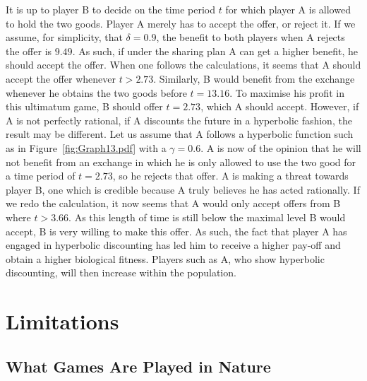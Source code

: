\documentclass[a4paper,10pt]{article}
\numberwithin{equation}{section}
\begin{document}
It is up to player B to decide on the time period $t$ for which player A is allowed to hold the two goods. Player A merely has to accept the offer, or reject it. If we assume, for simplicity, that $\delta=0.9$, the benefit to both players when A rejects the offer is $9.49$. As such, if under the sharing plan A can get a higher benefit, he should accept the offer. When one follows the calculations, it seems that A should accept the offer whenever $t>2.73$. Similarly, B would benefit from the exchange whenever he obtains the two goods before $t=13.16$. To maximise his profit in this ultimatum game, B should offer $t=2.73$, which A should accept. However, if A is not perfectly rational, if A discounts the future in a hyperbolic fashion, the result may be different. Let us assume that A follows a hyperbolic function such as in Figure~\ref{fig:Graph13.pdf} with a $\gamma=0.6$. A is now of the opinion that he will not benefit from an exchange in which he is only allowed to use the two good for a time period of $t=2.73$, so he rejects that offer. A is making a threat towards player B, one which is credible because A truly believes he has acted rationally. If we redo the calculation, it now seems that A would only accept offers from B where $t>3.66$. As this length of time is still below the maximal level B would accept, B is very willing to make this offer. As such, the fact that player A has engaged in hyperbolic discounting has led him to receive a higher pay-off and obtain a higher biological fitness. Players such as A, who show hyperbolic discounting, will then increase within the population.\\


\section{Limitations}
\label{sec:Limitations}
\subsection{What Games Are Played in Nature}
\label{sec:What Games Are Played in Nature}
\end{document}
